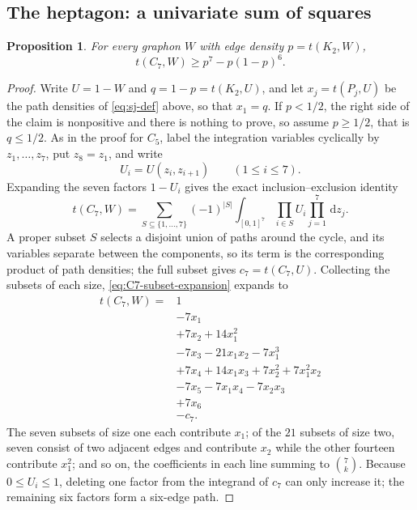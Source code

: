 ﻿\documentclass[11pt]{article}
\newtheorem{proposition}[theorem]{Proposition}
\numberwithin{equation}{section}
\newcommand{\dd}{\,\mathrm d}
\begin{document}
\subsection{The heptagon: a univariate sum of squares}\label{subsec:C7}

\begin{proposition}\label{prop:C7}
  For every graphon $W$ with edge density $p=t(K_2,W)$,
  \[
    t(C_7,W)\ge p^7-p(1-p)^6.
  \]
\end{proposition}

\begin{proof}
  Write $U=1-W$ and $q=1-p=t(K_2,U)$, and let $x_j=t(P_j,U)$ be the path densities of \eqref{eq:sj-def} above, so that $x_1=q$.
  If $p<1/2$, the right side of the claim is nonpositive and there is nothing to prove, so assume $p\ge1/2$, that is $q\le1/2$.
  As in the proof for $C_5$, label the integration variables cyclically by $z_1,\ldots,z_7$, put $z_8=z_1$, and write
  \[
    U_i=U(z_i,z_{i+1})\qquad(1\le i\le7).
  \]
  Expanding the seven factors $1-U_i$ gives the exact inclusion--exclusion identity
  \begin{equation}\label{eq:C7-subset-expansion}
    t(C_7,W)
    =\sum_{S\subseteq\{1,\ldots,7\}}(-1)^{|S|}
    \int_{[0,1]^7}\prod_{i\in S}U_i\prod_{j=1}^7\dd z_j.
  \end{equation}
  A proper subset $S$ selects a disjoint union of paths around the cycle, and its variables separate between the components, so its term is the corresponding product of path densities; the full subset gives $c_7=t(C_7,U)$.
  Collecting the subsets of each size, \eqref{eq:C7-subset-expansion} expands to
  \begin{align*}
    t(C_7,W)={}&1\\
    &-7x_1\\
    &+7x_2+14x_1^2\\
    &-7x_3-21x_1x_2-7x_1^3\\
    &+7x_4+14x_1x_3+7x_2^2+7x_1^2x_2\\
    &-7x_5-7x_1x_4-7x_2x_3\\
    &+7x_6\\
    &-c_7.
  \end{align*}
  The seven subsets of size one each contribute $x_1$; of the $21$ subsets of size two, seven consist of two adjacent edges and contribute $x_2$ while the other fourteen contribute $x_1^2$; and so on, the coefficients in each line summing to $\binom7k$.
  Because $0\le U_i\le1$, deleting one factor from the integrand of $c_7$ can only increase it; the remaining six factors form a six-edge path.

\end{proof}
\end{document}
